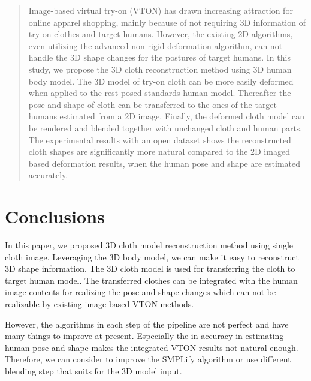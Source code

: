 \documentclass[runningheads]{llncs}
\begin{document}
\begin{abstract}

Image-based virtual try-on (VTON) has drawn increasing attraction for online apparel shopping, mainly because of not requiring 3D information of try-on clothes and target humans. However, the existing 2D algorithms, even utilizing the advanced non-rigid deformation algorithm, can not handle the 3D shape changes for the postures of target humans. In this study, we propose the 3D cloth reconstruction method using 3D human body model. The 3D model of try-on cloth can be more easily deformed when applied to the rest posed standards human model. Thereafter the pose and shape of cloth can be transferred to the ones of the target humans estimated from a 2D image. Finally, the deformed cloth model can be rendered and blended together with unchanged cloth and human parts. The experimental results with an open dataset shows the reconstructed cloth shapes are significantly more natural compared to the 2D imaged based deformation results, when the human pose and shape are estimated accurately.         

\end{abstract}




\section{Conclusions}  \label{section:conclusion}

In this paper, we proposed 3D cloth model reconstruction method using single cloth image. Leveraging the 3D body model, we can make it easy to reconstruct 3D shape information. The 3D cloth model is used for transferring the cloth to target human model.  The transferred clothes can be integrated with the human image contents for realizing the pose and shape changes which can not be realizable by existing image based VTON methods.

However, the algorithms in each step of the pipeline are not perfect and have many things to improve at present. Especially the in-accuracy in estimating human pose and shape makes the integrated VTON results not natural enough. Therefore, we can consider to improve the SMPLify\cite{Bogo2016SMPLify} algorithm or use different blending step that suits for the 3D model input.
     

  
\clearpage
%
%


\end{document}
